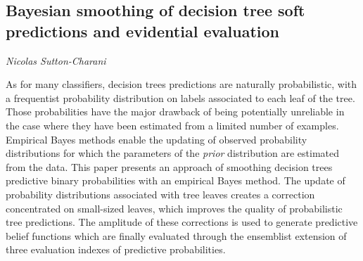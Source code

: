 \documentclass[../booklet.tex]{subfiles}
\begin{document}
\subsection[Bayesian smoothing of decision tree soft predictions and evidential evaluation. {\it Nicolas Sutton-Charani}]{Bayesian smoothing of decision tree soft predictions and evidential evaluation}

\begin{center}
  {\it Nicolas Sutton-Charani}
\end{center}



As for many classifiers, decision trees predictions are naturally probabilistic, with a frequentist probability distribution on labels associated to each leaf of the tree. 
	Those probabilities have the major drawback of being potentially unreliable in the case where they have been estimated from a limited number of examples.
	Empirical Bayes methods enable the updating of observed probability distributions for which the parameters of the \textit{prior} distribution are estimated from the data. 
	This paper presents an approach of smoothing decision trees predictive binary probabilities with an empirical Bayes method. 
	The update of probability distributions associated with tree leaves creates a correction concentrated on small-sized leaves, which improves the quality of probabilistic tree predictions.
	The amplitude of these corrections is used to generate predictive belief functions which are finally evaluated through the ensemblist extension of three evaluation indexes of predictive probabilities.

\end{document}
